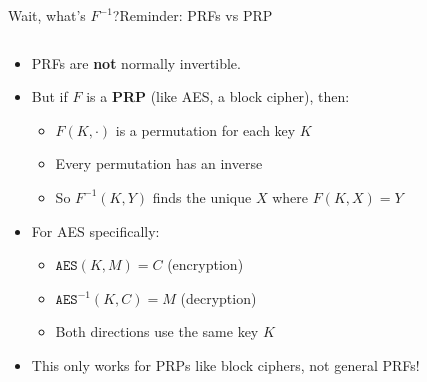 \documentclass[aspectratio=169, lualatex, handout]{beamer}
\begin{document}
\begin{frame}{Wait, what's $F^{-1}$?}{Reminder: PRFs vs PRP}
	\begin{columns}[c]
		\begin{column}{0.65\textwidth}
			\begin{itemize}
				\item PRFs are \textbf{not} normally invertible.
				\item But if $F$ is a \textbf{PRP} (like AES, a block cipher), then:
				      \begin{itemize}
					      \item $F(K, \cdot)$ is a permutation for each key $K$
					      \item Every permutation has an inverse
					      \item So $F^{-1}(K, Y)$ finds the unique $X$ where $F(K, X) = Y$
				      \end{itemize}
				\item For AES specifically:
				      \begin{itemize}
					      \item $\texttt{AES}(K, M) = C$ (encryption)
					      \item $\texttt{AES}^{-1}(K, C) = M$ (decryption)
					      \item Both directions use the same key $K$
				      \end{itemize}
				\item This only works for PRPs like block ciphers, not general PRFs!
			\end{itemize}
		\end{column}
		\begin{column}{0.35\textwidth}
		\end{column}
	\end{columns}
\end{frame}
\end{document}
